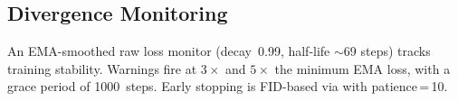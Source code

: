 \subsection{Divergence Monitoring}

An EMA-smoothed raw loss monitor (decay~0.99, half-life ${\sim}$69 steps)
tracks training stability.  Warnings fire at $3\times$ and $5\times$ the
minimum EMA loss, with a grace period of 1000~steps.  Early stopping is
FID-based via  with patience\,=\,10.
